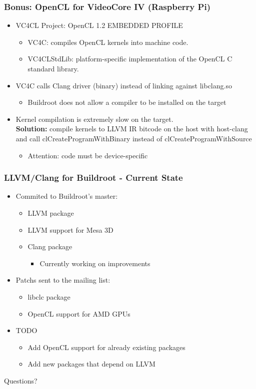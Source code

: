 \documentclass{smilebeamer}
\begin{document}
\begin{frame}
\frametitle{Bonus: OpenCL for VideoCore IV (Raspberry Pi)}
\begin{itemize}
  \item VC4CL Project: OpenCL 1.2 EMBEDDED PROFILE
  \begin{itemize}
    \item VC4C: compiles OpenCL kernels into machine code.
    \item VC4CLStdLib: platform-specific implementation of the OpenCL C standard
    library.
  \end{itemize}
  \item VC4C calls Clang driver (binary) instead of linking against libclang.so
  \begin{itemize}
    \item Buildroot does not allow a compiler to be installed on the target
  \end{itemize}
  \item Kernel compilation is extremely slow on the target.\\
  \textbf{Solution:} compile kernels to LLVM IR bitcode on the host with host-clang and
  call {\selectfont clCreateProgramWithBinary} instead of
  {\selectfont clCreateProgramWithSource}
  \begin{itemize}
    \item Attention: code must be device-specific
  \end{itemize}
\end{itemize}
\end{frame}

\begin{frame}
\frametitle{LLVM/Clang for Buildroot - Current State}
\begin{itemize}
  \item Commited to Buildroot's master:
  \begin{itemize}
    \item LLVM package \checkmark
    \item LLVM support for Mesa 3D \checkmark
    \item Clang package \checkmark
    \begin{itemize}
      \item Currently working on improvements
    \end{itemize}
  \end{itemize}
  \item Patchs sent to the mailing list:
  \begin{itemize}
    \item libclc package
    \item OpenCL support for AMD GPUs
  \end{itemize}
  \item TODO
  \begin{itemize}
    \item Add OpenCL support for already existing packages
    \item Add new packages that depend on LLVM
  \end{itemize}
\end{itemize}
\end{frame}

\begin{frame}
\Huge{\centerline{Questions?}}
\end{frame}
\end{document}
